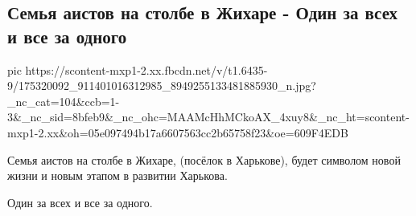  
 
 
 
 
\subsection{Семья аистов на столбе в Жихаре - Один за всех и все за одного}
\label{sec:17_04_2021.fb.lesik_andrei.1.aisty}

\ifcmt
  pic https://scontent-mxp1-2.xx.fbcdn.net/v/t1.6435-9/175320092_911401016312985_8949255133481885930_n.jpg?_nc_cat=104&ccb=1-3&_nc_sid=8bfeb9&_nc_ohc=MAAMcHhMCkoAX_4xuy8&_nc_ht=scontent-mxp1-2.xx&oh=05e097494b17a6607563cc2b65758f23&oe=609F4EDB
\fi

Семья аистов на столбе в Жихаре, (посёлок в Харькове), будет символом новой
жизни и новым этапом в развитии Харькова. 

Один за всех и все за одного.
